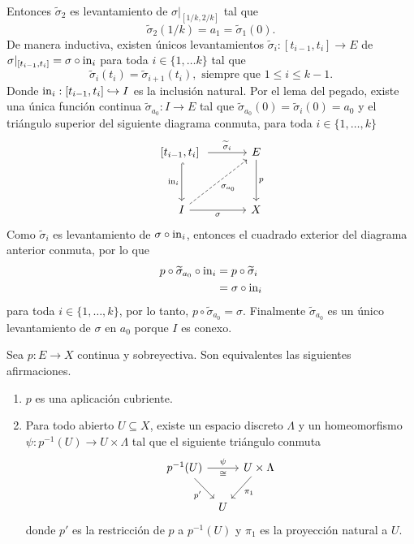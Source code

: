 \begin{dem}
\begin{equation*}
\begin{tikzcd}[column sep=0.95cm]
        \end{tikzcd}
    \end{equation*}
    Entonces $\widetilde{\sigma}_2$ es levantamiento de $\sigma|_{[1/k,2/k]}$ tal que $$\widetilde{\sigma}_2(1/k)=a_1=\widetilde{\sigma}_1(0).$$
    De manera inductiva, existen únicos levantamientos $\widetilde{\sigma}_i:[t_{i-1},t_{i}]\to E$ 
    de $\sigma|_{[t_{i-1},t_i]}=\sigma\circ \mathrm{in}_i$
    para toda $i\in\{1,\ldots k\}$ tal que $$\widetilde{\sigma}_i(t_{i})=\widetilde{\sigma}_{i+1}(t_i), \text{ siempre que } 1\leq i\leq k-1.$$  
    Donde $\mathrm{in}_i:[t_{i-1},t_i]\hookrightarrow I$ es la inclusión natural.
    Por el lema del pegado, existe una única función continua $\widetilde{\sigma}_{a_0}:I\to E$ tal que $\widetilde{\sigma}_{a_0}(0)=\widetilde{\sigma}_i(0)=a_0$ y el triángulo superior del siguiente diagrama conmuta, para toda $i\in\{1,\ldots,k\}$
    \begin{equation*}
        \begin{tikzcd}[column sep=1.2cm, row sep = 1.2cm]
             \text{[} t_{i-1}, t_i\text{]
            } \arrow[d,hook, "\In_i"']\arrow[r,"\widetilde{\sigma}_i"] & E\arrow[d,"p"]\\
            I \arrow[r, "\sigma"']\arrow[ur, "\sigma_{a_0}"',dashed]& X
        \end{tikzcd}
    \end{equation*}
    Como $\widetilde{\sigma}_i$ es levantamiento de $\sigma\circ\mathrm{in}_i$, entonces el cuadrado exterior del diagrama anterior conmuta, por lo que
    \begin{align*}
        p\circ\widetilde{\sigma}_{a_0}\circ\mathrm{in}_i&=p\circ \widetilde{\sigma}_i\\
        &=\sigma\circ \mathrm{in}_i
    \end{align*}
    para toda $i\in\{1,\ldots,k\}$, por lo tanto, $p\circ \widetilde{\sigma}_{a_0}=\sigma$. Finalmente $\widetilde{\sigma}_{a_0}$ es un único levantamiento de $\sigma$ en $a_0$ porque $I$ es conexo.
\end{dem}
\begin{lema}
    \label{lema:lema 1 cubriente}
    Sea $p:E\to X$ continua y sobreyectiva. Son equivalentes las siguientes afirmaciones.
    \begin{enumerate}
        \item[(1)] $p$ es una aplicación cubriente.
        \item[(2)] Para todo abierto $U\subseteq X$, existe un espacio discreto $\Lambda$ y un homeomorfismo $\psi:p^{-1}(U)\to U\times \Lambda$ tal que el siguiente triángulo conmuta
        \begin{equation}
        \label{lema: diagrama_1_cubriente}
            \begin{tikzcd}[column sep=0.2cm]
                p^{-1}(U)\arrow[rr,"\psi","\cong"']\arrow[dr, "p'"'] & & U\times \Lambda\arrow[dl,"\pi_1"]\\
                & U &
            \end{tikzcd}
        \end{equation}
        donde $p'$ es la restricción de $p$ a $p^{-1}(U)$ y $\pi_1$ es la proyección natural a $U$.
    \end{enumerate}
\end{lema}
